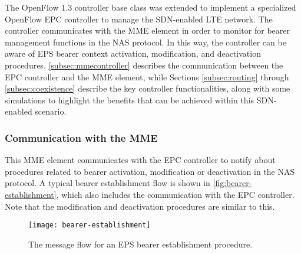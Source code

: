 The OpenFlow 1.3 controller base class was extended to implement a specialized
OpenFlow \ac{EPC} controller to manage the \ac{SDN}-enabled \ac{LTE} network.
The controller communicates with the \ac{MME} element in order to monitor for
bearer management functions in the \ac{NAS} protocol. In this way, the
controller can be aware of \ac{EPS} bearer context activation, modification,
and deactivation procedures. \autoref{subsec:mmecontroller} describes the
communication between the \ac{EPC} controller and the \ac{MME} element, while
Sections \ref{subsec:routing} through \ref{subsec:coexistence} describe the key
controller functionalities, along with some simulations to highlight the
benefits that can be achieved within this \ac{SDN}-enabled scenario.

\subsubsection{Communication with the MME}
\label{subsec:mmecontroller}

This \ac{MME} element communicates with the \ac{EPC} controller to notify about
procedures related to bearer activation, modification or deactivation in the
\ac{NAS} protocol. A typical bearer establishment flow is shown in
\autoref{fig:bearer-establishment}, which also includes the communication with
the \ac{EPC} controller. Note that the modification and deactivation procedures
are similar to this.

\begin{figure}[b!]
  \centering
  \texttt{[image: bearer-establishment]}
  \caption{The message flow for an EPS bearer establishment procedure.}
  \label{fig:bearer-establishment}
\end{figure}

